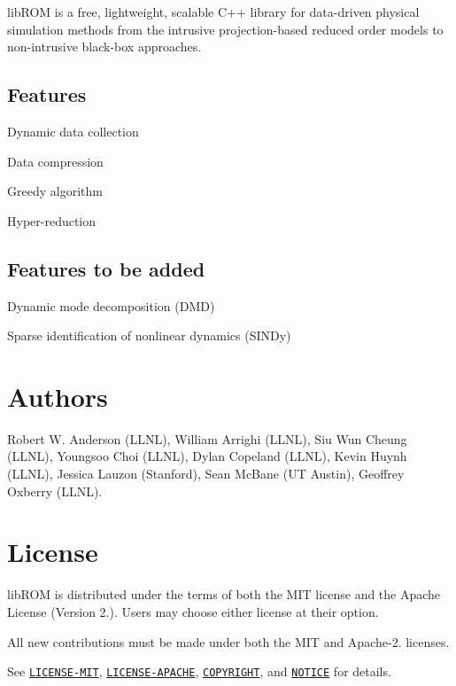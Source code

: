 lib\-R\-O\-M is a free, lightweight, scalable C++ library for data-\/driven physical simulation methods from the intrusive projection-\/based reduced order models to non-\/intrusive black-\/box approaches.

\subsection*{Features}


\begin{DoxyItemize}
\item Dynamic data collection
\item Data compression
\item Greedy algorithm
\item Hyper-\/reduction
\end{DoxyItemize}

\subsection*{Features to be added}


\begin{DoxyItemize}
\item Dynamic mode decomposition (D\-M\-D)
\item Sparse identification of nonlinear dynamics (S\-I\-N\-Dy)
\end{DoxyItemize}

\section*{Authors}

Robert W. Anderson (L\-L\-N\-L), William Arrighi (L\-L\-N\-L), Siu Wun Cheung (L\-L\-N\-L), Youngsoo Choi (L\-L\-N\-L), Dylan Copeland (L\-L\-N\-L), Kevin Huynh (L\-L\-N\-L), Jessica Lauzon (Stanford), Sean Mc\-Bane (U\-T Austin), Geoffrey Oxberry (L\-L\-N\-L).

\section*{License}

lib\-R\-O\-M is distributed under the terms of both the M\-I\-T license and the Apache License (Version 2.). Users may choose either license at their option.

All new contributions must be made under both the M\-I\-T and Apache-\/2. licenses.

See \href{https://github.com/LLNL/libROM/blob/master/LICENSE-MIT}{\tt L\-I\-C\-E\-N\-S\-E-\/\-M\-I\-T}, \href{https://github.com/LLNL/libROM/blob/master/LICENSE-APACHE}{\tt L\-I\-C\-E\-N\-S\-E-\/\-A\-P\-A\-C\-H\-E}, \href{https://github.com/LLNL/libROM/blob/master/COPYRIGHT}{\tt C\-O\-P\-Y\-R\-I\-G\-H\-T}, and \href{https://github.com/LLNL/libROM/blob/master/NOTICE}{\tt N\-O\-T\-I\-C\-E} for details.

